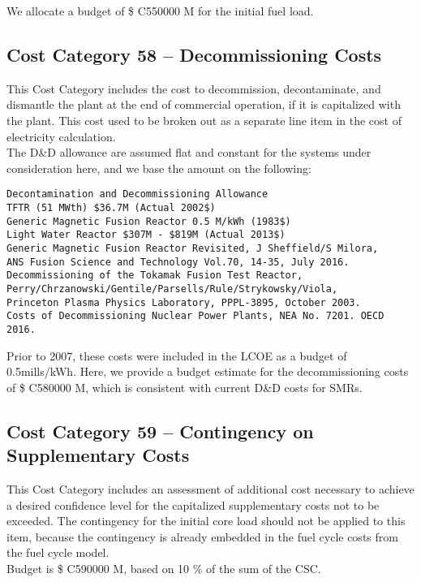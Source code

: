We allocate a budget of \$ C550000 M for the initial fuel load.  

\subsection*{Cost Category 58 – Decommissioning Costs}
This Cost Category includes the cost to decommission, decontaminate, and dismantle the plant at the end of commercial operation, if it is capitalized with the plant.  This cost used to be broken out as a separate line item in the cost of electricity calculation.\\

The D\&D allowance are assumed flat and constant for the systems under consideration here, and we base the amount on the following:

\begin{verbatim} 
Decontamination and Decommissioning Allowance 
TFTR (51 MWth) $36.7M (Actual 2002$) 
Generic Magnetic Fusion Reactor 0.5 M/kWh (1983$) 
Light Water Reactor $307M - $819M (Actual 2013$) 
Generic Magnetic Fusion Reactor Revisited, J Sheffield/S Milora,  
ANS Fusion Science and Technology Vol.70, 14-35, July 2016. 
Decommissioning of the Tokamak Fusion Test Reactor,
Perry/Chrzanowski/Gentile/Parsells/Rule/Strykowsky/Viola, 
Princeton Plasma Physics Laboratory, PPPL-3895, October 2003.
Costs of Decommissioning Nuclear Power Plants, NEA No. 7201. OECD 2016.
\end{verbatim} 

Prior to 2007, these costs were included in the LCOE as a budget of 0.5mills/kWh.  Here, we provide a budget estimate for the decommissioning costs of \$ C580000 M, which is consistent with current D\&D costs for SMRs. 

\subsection*{Cost Category 59 – Contingency on Supplementary Costs}
This Cost Category includes an assessment of additional cost necessary to achieve a desired confidence level for the capitalized supplementary costs not to be exceeded. The contingency for the initial core load should not be applied to this item, because the contingency is already embedded in the fuel cycle costs from the fuel cycle model.\\

Budget is \$ C590000 M, based on 10 \% of the sum of the CSC.
